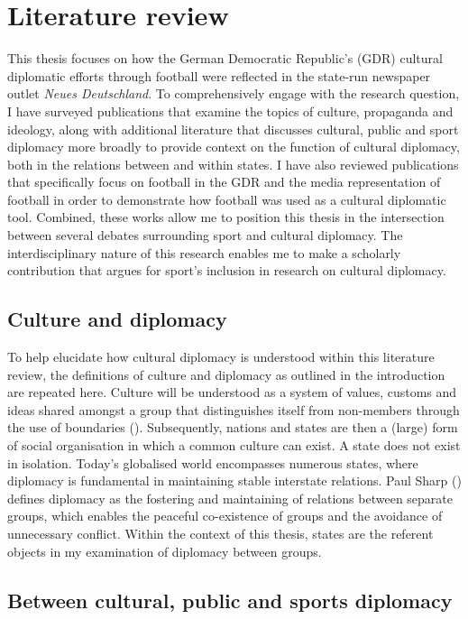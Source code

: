 \chapter{Literature review\label{cha:litreivew}}

This thesis focuses on how the German Democratic Republic’s (GDR) cultural diplomatic efforts through football were reflected in the state-run newspaper outlet \textit{Neues Deutschland}. To comprehensively engage with the research question, I have surveyed publications that examine the topics of culture, propaganda and ideology, along with additional literature that discusses cultural, public and sport diplomacy more broadly to provide context on the function of cultural diplomacy, both in the relations between and within states. I have also reviewed publications that specifically focus on football in the GDR and the media representation of football in order to demonstrate how football was used as a cultural diplomatic tool. Combined, these works allow me to position this thesis in the intersection between several debates surrounding sport and cultural diplomacy. The interdisciplinary nature of this research enables me to make a scholarly contribution that argues for sport’s inclusion in research on cultural diplomacy.

\section{Culture and diplomacy}

To help elucidate how cultural diplomacy is understood within this literature review, the definitions of culture and diplomacy as outlined in the introduction are repeated here. Culture will be understood as a system of values, customs and ideas shared amongst a group that distinguishes itself from non-members through the use of boundaries (\cite{cohen1995}). Subsequently, nations and states are then a (large) form of social organisation in which a common culture can exist. A state does not exist in isolation. Today’s globalised world encompasses numerous states, where diplomacy is fundamental in maintaining stable interstate relations. Paul Sharp (\citeyear{sharp2003}) defines diplomacy as the fostering and maintaining of relations between separate groups, which enables the peaceful co-existence of groups and the avoidance of unnecessary conflict. Within the context of this thesis, states are the referent objects in my examination of diplomacy between groups.

\section{Between cultural, public and sports diplomacy}

